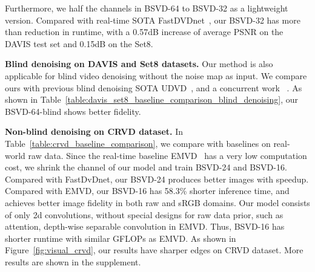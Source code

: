 \documentclass[sigconf]{acmart}
\begin{document}
Furthermore, we half the channels in BSVD-64 to BSVD-32 as a lightweight version.
Compared with real-time SOTA FastDVDnet~\cite{Tassano2020FastDVDNet}, our BSVD-32 has more than  reduction in runtime, with a 0.57dB increase of average PSNR on the DAVIS test set and 0.15dB on the Set8.










\textbf{Blind denoising on DAVIS and Set8 datasets.}
Our method is also applicable for blind video denoising without the noise map as input. We compare ours with previous blind denoising SOTA UDVD~\cite{Sheth2021UDVD}, and a concurrent work ~\cite{Xiang2022ReMoNet}. As shown in Table~\ref{table:davis_set8_baseline_comparison_blind_denoising}, our BSVD-64-blind shows better fidelity.






\textbf{Non-blind denoising on CRVD dataset.}
In Table~\ref{table:crvd_baseline_comparison}, we compare with baselines on real-world raw data.
Since the real-time baseline EMVD~\cite{Maggioni2021Efficient} has a very low computation cost, we shrink the channel of our model and train BSVD-24 and BSVD-16.
Compared with FastDvDnet, our BSVD-24 produces better images with  speedup.
 Compared with EMVD, our BSVD-16 has 58.3\% shorter inference time, and achieves better image fidelity in both raw and sRGB domains.
Our model consists of only 2d convolutions, without special designs for raw data prior, such as attention, depth-wise separable convolution in EMVD. Thus, BSVD-16 has shorter runtime with similar GFLOPs as EMVD.
As shown in Figure~\ref{fig:visual_crvd}, our results have sharper edges on CRVD dataset. More results are shown in the supplement.
\end{document}

